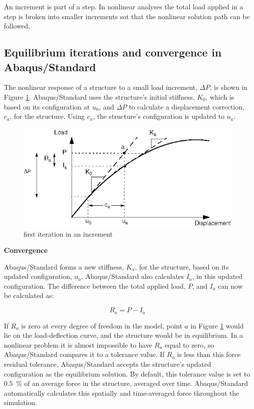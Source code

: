 An increment is part of a step. In nonlinear analyses the total load applied in a step is broken into smaller increments sot that the nonlinear solution path can be followed.

\subsection{Equilibrium iterations and convergence in Abaqus/Standard}
The nonlinear response of a structure to a small load increment, $ \Delta P $, is shown in Figure \ref{fig:first_iteration_in_an_increment}. Abaqus/Standard uses the structure's initial stiffness, $ K_0 $, which is based on its configuration at $ u_0 $, and $ \Delta P $ to calculate a displacement correction, $ c_a $, for the structure. Using $ c_a $, the structure's configuration is updated to $ u_a $.

\begin{figure}[h]
\centering
\includegraphics[width=0.7\linewidth]{figure/first_iteration_in_an_increment}
\caption{first iteration in an increment}
\label{fig:first_iteration_in_an_increment}
\end{figure}

\textbf{Convergence}

Abaqus/Standard forms a new stiffness, $ K_a $, for the structure, based on its updated configuration, $ u_a $. Abaqus/Standard also calculates $ I_a $, in this updated configuration. The difference between the total applied load, $ P $, and $ I_a $ can now be calculated as:

\begin{equation}
R_a = P - I_a
\end{equation}

If $ R_a $ is zero at every degree of freedom in the model, point $ a $ in Figure \ref{fig:first_iteration_in_an_increment} would lie on the load-deflection curve, and the structure would be in equilibrium. In a nonlinear problem it is almost impossible to have $ R_a $ equal to zero, so Abaqus/Standard compares it to a tolerance value. If $ R_a $ is less than this force residual tolerance, Abaqus/Standard accepts the structure's updated configuration as the equilibrium solution. By default, this tolerance value is set to \SI{0.5}{\percent} of an average force in the structure, averaged over time. Abaqus/Standard automatically calculates this spatially and time-averaged force throughout the simulation.

